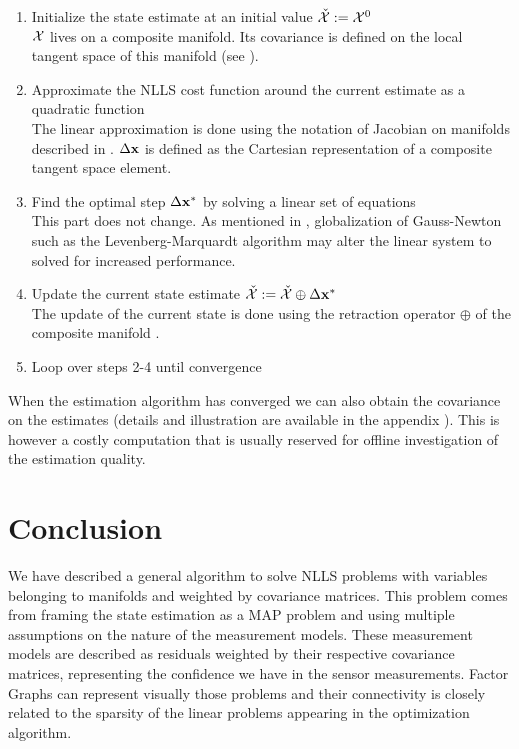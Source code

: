 \begin{enumerate}
    \item Initialize the state estimate at an initial value $\check{\mathcal{X}} := \mathcal{X}^0$ \\
    $\mathcal{X}$ lives on a composite manifold. Its covariance is defined on the local tangent space of this manifold (see ).
    \item Approximate the NLLS cost function around the current estimate as a quadratic function \\
    The linear approximation is done using the notation of Jacobian on manifolds described in .
    $\Delta {\bf x}$ is defined as the Cartesian representation of a composite tangent space element.  
    \item Find the optimal step $\Delta {\bf x}^*$ by solving a linear set of equations  \\
    This part does not change. As mentioned in , globalization of Gauss-Newton such as the Levenberg-Marquardt algorithm
    may alter the linear system to solved for increased performance.
    \item Update the current state estimate $\check{\mathcal{X}} := \check{\mathcal{X}} \oplus \Delta {\bf x}^*$ \\
    The update of the current state is done using the retraction operator $\oplus$ of the composite manifold .
    \item Loop over steps 2-4 until convergence
\end{enumerate}

When the estimation algorithm has converged we can also obtain the covariance on the estimates (details and illustration are available in the 
appendix ). This is however a costly computation that is usually reserved for offline investigation of the estimation quality. 



\section{Conclusion}

We have described a general algorithm to solve NLLS problems with variables belonging to manifolds and weighted by covariance matrices. This problem
comes from framing the state estimation as a MAP problem and using multiple assumptions on the nature of the measurement models. These measurement models
are described as residuals weighted by their respective covariance matrices, representing the confidence we have in the sensor measurements. Factor Graphs can 
represent visually those problems and their connectivity is closely related to the sparsity of the linear problems appearing in the optimization algorithm.

